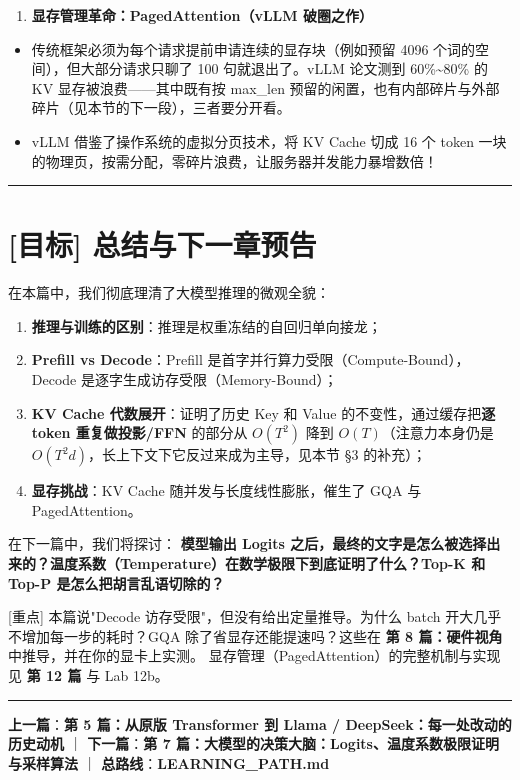 \begin{enumerate}
  \item \textbf{显存管理革命：PagedAttention（vLLM 破圈之作）}
\end{enumerate}

\begin{itemize}
  \item 传统框架必须为每个请求提前申请连续的显存块（例如预留 4096 个词的空间），但大部分请求只聊了 100 句就退出了。vLLM 论文测到 60\%\textasciitilde{}80\% 的 KV 显存被浪费——其中既有按 max\_len 预留的闲置，也有内部碎片与外部碎片（见本节的下一段），三者要分开看。
  \item vLLM 借鉴了操作系统的虚拟分页技术，将 KV Cache 切成 16 个 token 一块的物理页，按需分配，零碎片浪费，让服务器并发能力暴增数倍！
\end{itemize}

\vspace{0.8em}\hrule\vspace{0.8em}

\section{[目标] 总结与下一章预告}

在本篇中，我们彻底理清了大模型推理的微观全貌：
\begin{enumerate}
  \item \textbf{推理与训练的区别}：推理是权重冻结的自回归单向接龙；
  \item \textbf{Prefill vs Decode}：Prefill 是首字并行算力受限（Compute-Bound），Decode 是逐字生成访存受限（Memory-Bound）；
  \item \textbf{KV Cache 代数展开}：证明了历史 Key 和 Value 的不变性，通过缓存把\textbf{逐 token 重复做投影/FFN} 的部分从 $O(T^2)$ 降到 $O(T)$（注意力本身仍是 $O(T^2d)$，长上下文下它反过来成为主导，见本节 §3 的补充）；
  \item \textbf{显存挑战}：KV Cache 随并发与长度线性膨胀，催生了 GQA 与 PagedAttention。
\end{enumerate}

在下一篇中，我们将探讨：
\textbf{模型输出 Logits 之后，最终的文字是怎么被选择出来的？温度系数（Temperature）在数学极限下到底证明了什么？Top-K 和 Top-P 是怎么把胡言乱语切除的？}

\begin{mathBox}[核心数学定理推导]
{}[重点] 本篇说"Decode 访存受限"，但没有给出定量推导。为什么 batch 开大几乎不增加每一步的耗时？GQA 除了省显存还能提速吗？这些在 \textbf{第 8 篇：硬件视角} 中推导，并在你的显卡上实测。
显存管理（PagedAttention）的完整机制与实现见 \textbf{第 12 篇} 与 Lab 12b。
\end{mathBox}

\vspace{0.8em}\hrule\vspace{0.8em}

\textbf{上一篇}：\textbf{第 5 篇：从原版 Transformer 到 Llama / DeepSeek：每一处改动的历史动机} ｜ \textbf{下一篇}：\textbf{第 7 篇：大模型的决策大脑：Logits、温度系数极限证明与采样算法} ｜ \textbf{总路线}：\textbf{LEARNING\_PATH.md}
